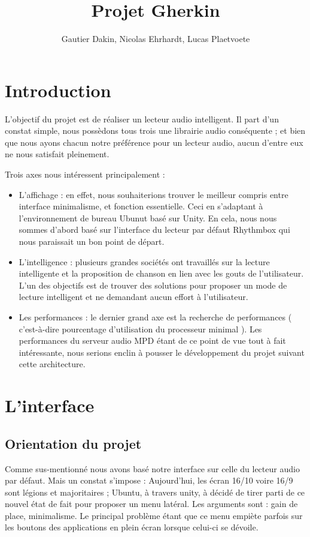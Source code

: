 \documentclass{report}
\author{Gautier Dakin, Nicolas Ehrhardt, Lucas Plaetvoete}
\title{Projet Gherkin}
\begin{document}
\maketitle

\section*{Introduction}
L'objectif du projet est de réaliser un lecteur audio intelligent. Il part d'un constat simple, nous possèdons tous trois une librairie audio conséquente ; et bien que nous ayons chacun notre préférence pour un lecteur audio, aucun d'entre eux ne nous satisfait pleinement.

Trois axes nous intéressent principalement :
\begin{itemize}
\item L'affichage : en effet, nous souhaiterions trouver le meilleur compris entre interface minimalisme, et fonction essentielle. Ceci en s'adaptant à l'environnement de bureau Ubunut basé sur Unity. En cela, nous nous sommes d'abord basé sur l'interface du lecteur par défaut Rhythmbox qui nous paraissait un bon point de départ.

\item L'intelligence : plusieurs grandes sociétés ont travaillés sur la lecture intelligente et la proposition de chanson en lien avec les gouts de l'utilisateur. L'un des objectifs est de trouver des solutions pour proposer un mode de lecture intelligent et ne demandant aucun effort à l'utilisateur.

\item Les performances : le dernier grand axe est la recherche de performances ( c'est-à-dire pourcentage d'utilisation du processeur minimal ). Les performances du serveur audio MPD étant de ce point de vue tout à fait intéressante, nous serions enclin à pousser le développement du projet suivant cette architecture.
\end{itemize}

\section*{L'interface}
\subsection*{Orientation du projet}
Comme sus-mentionné nous avons basé notre interface sur celle du lecteur audio par défaut. Mais un constat s'impose : Aujourd'hui, les écran 16/10 voire 16/9 sont légions et majoritaires ; Ubuntu, à travers unity, à décidé de tirer parti de ce nouvel état de fait pour proposer un menu latéral. Les arguments sont : gain de place, minimalisme. Le principal problème étant que ce menu empiète parfois sur les boutons des applications en plein écran lorsque celui-ci se dévoile.
\end{document}
